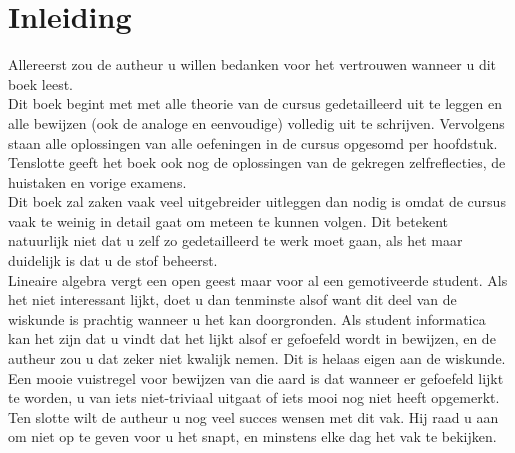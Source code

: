 \documentclass[lineaire_algebra_oplossingen.tex]{subfiles}
\begin{document}
\newpage
\section*{Inleiding}

\noindent Allereerst zou de autheur u willen bedanken voor het vertrouwen wanneer u dit boek leest.\\

\noindent Dit boek begint met met alle theorie van de cursus gedetailleerd uit te leggen en alle bewijzen (ook de analoge en eenvoudige) volledig uit te schrijven. Vervolgens staan alle oplossingen van alle oefeningen in de cursus opgesomd per hoofdstuk. Tenslotte geeft het boek ook nog de oplossingen van de gekregen zelfreflecties, de huistaken en vorige examens.\\

\noindent Dit boek zal zaken vaak veel uitgebreider uitleggen dan nodig is omdat de cursus vaak te weinig in detail gaat om meteen te kunnen volgen. Dit betekent natuurlijk niet dat u zelf zo gedetailleerd te werk moet gaan, als het maar duidelijk is dat u de stof beheerst.\\

\noindent Lineaire algebra vergt een open geest maar voor al een gemotiveerde student.
Als het niet interessant lijkt, doet u dan tenminste alsof want dit deel van de wiskunde is prachtig wanneer u het kan doorgronden.
Als student informatica kan het zijn dat u vindt dat het lijkt alsof er gefoefeld wordt in bewijzen, en de autheur zou u dat zeker niet kwalijk nemen. Dit is helaas eigen aan de wiskunde.
Een mooie vuistregel voor bewijzen van die aard is dat wanneer er gefoefeld lijkt te worden, u van iets niet-triviaal uitgaat of iets mooi nog niet heeft opgemerkt.\\

\noindent Ten slotte wilt de autheur u nog veel succes wensen met dit vak. Hij raad u aan om niet op te geven voor u het snapt, en minstens elke dag het vak te bekijken.
\end{document}
